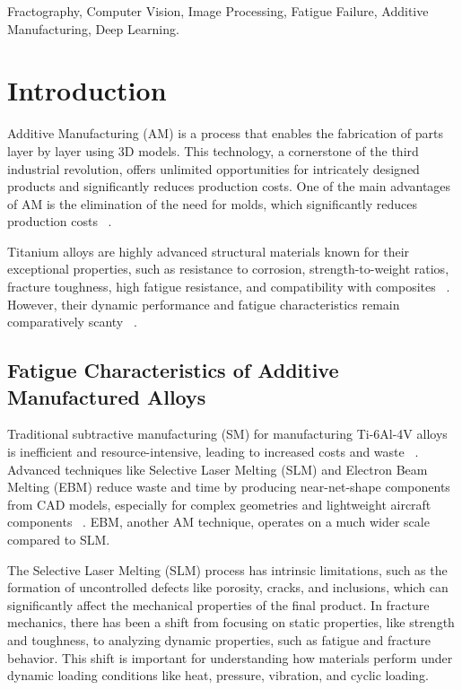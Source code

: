 \documentclass{ieeeaccess}
\begin{document}
\begin{keywords}
Fractography, Computer Vision, Image Processing, Fatigue Failure, Additive Manufacturing, Deep Learning.
\end{keywords}

\titlepgskip=-15pt

\maketitle



\section{Introduction}
\label{introduction}
Additive Manufacturing (AM) is a process that enables the fabrication of parts layer by layer using 3D models. This technology, a cornerstone of the third industrial revolution, offers unlimited opportunities for intricately designed products and significantly reduces production costs. One of the main advantages of AM is the elimination of the need for molds, which significantly reduces production costs ~\cite{herzog2016additive}.

Titanium alloys are highly advanced structural materials known for their exceptional properties, such as resistance to corrosion, strength-to-weight ratios, fracture toughness, high fatigue resistance, and compatibility with composites ~\cite{qian2016additive}. However, their dynamic performance and fatigue characteristics remain comparatively scanty ~\cite{debroy2018additive,gorsse2017additive}.

\subsection{Fatigue Characteristics of Additive Manufactured Alloys}
Traditional subtractive manufacturing (SM) for manufacturing Ti-6Al-4V alloys is inefficient and resource-intensive, leading to increased costs and waste ~\cite{peng2017toward}. Advanced techniques like Selective Laser Melting (SLM) and Electron Beam Melting (EBM) reduce waste and time by producing near-net-shape components from CAD models, especially for complex geometries and lightweight aircraft components ~\cite{fatimah2013sustainable}. EBM, another AM technique, operates on a much wider scale compared to SLM.

The Selective Laser Melting (SLM) process has intrinsic limitations, such as the formation of uncontrolled defects like porosity, cracks, and inclusions, which can significantly affect the mechanical properties of the final product. In fracture mechanics, there has been a shift from focusing on static properties, like strength and toughness, to analyzing dynamic properties, such as fatigue and fracture behavior. This shift is important for understanding how materials perform under dynamic loading conditions like heat, pressure, vibration, and cyclic loading.
\end{document}
